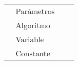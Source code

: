 \begin{table}[]
\begin{tabular}{|llll|}
                                                                               & Parámetros    &                                                                                                                                                                                                             &                                                                                                                                                                                                                                                                \\
                                                                               & Algoritmo     &                                                                                                                                                                                                             &                                                                                                                                                                                                                                                                \\
                                                                               & Variable      &                                                                                                                                                                                                             &                                                                                                                                                                                                                                                                \\
                                                                               & Constante     &                                                                                                                                                                                                             &                                                                                                                                                                                                                                                                \\ \hline
\end{tabular}
\end{table}